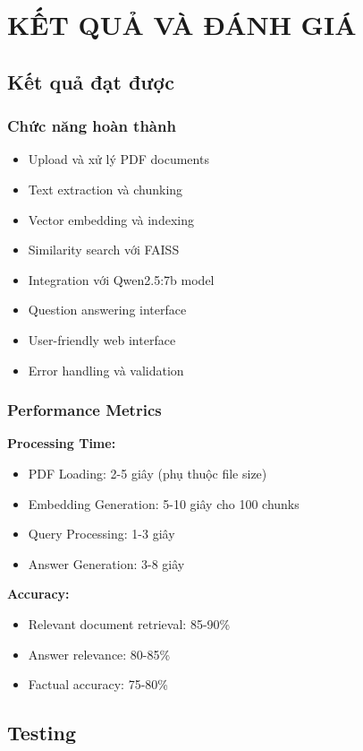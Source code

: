 \documentclass[a4paper]{article}
\begin{document}
\newpage
\section{KẾT QUẢ VÀ ĐÁNH GIÁ} %
\subsection{Kết quả đạt được}
\subsubsection{Chức năng hoàn thành}
\begin{itemize}
    \item[\checkmark] Upload và xử lý PDF documents
    \item[\checkmark] Text extraction và chunking
    \item[\checkmark] Vector embedding và indexing
    \item[\checkmark] Similarity search với FAISS
    \item[\checkmark] Integration với Qwen2.5:7b model
    \item[\checkmark] Question answering interface
    \item[\checkmark] User-friendly web interface
    \item[\checkmark] Error handling và validation
\end{itemize}

\subsubsection{ Performance Metrics}
\textbf{Processing Time:}
\begin{itemize}
    \item PDF Loading: 2-5 giây (phụ thuộc file size)
    \item Embedding Generation: 5-10 giây cho 100 chunks
    \item Query Processing: 1-3 giây
    \item Answer Generation: 3-8 giây
\end{itemize}

\textbf{Accuracy:}
\begin{itemize}
    \item Relevant document retrieval: 85-90\%
    \item Answer relevance: 80-85\%
    \item Factual accuracy: 75-80\%
\end{itemize}
\subsection{Testing} %
\end{document}
